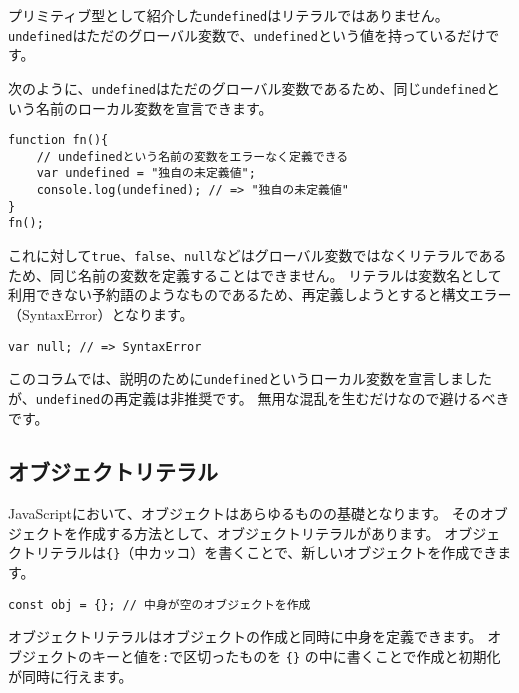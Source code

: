 \begin{tcolorbox}[title=undefinedはリテラルではない]\label{undefined-is-not-literal}

プリミティブ型として紹介した\texttt{undefined}はリテラルではありません。
\texttt{undefined}はただのグローバル変数で、\texttt{undefined}という値を持っているだけです。

次のように、\texttt{undefined}はただのグローバル変数であるため、同じ\texttt{undefined}という名前のローカル変数を宣言できます。

\begin{lstlisting}
function fn(){
    // undefinedという名前の変数をエラーなく定義できる
    var undefined = "独自の未定義値"; 
    console.log(undefined); // => "独自の未定義値"
}
fn();
\end{lstlisting}

これに対して\texttt{true}、\texttt{false}、\texttt{null}などはグローバル変数ではなくリテラルであるため、同じ名前の変数を定義することはできません。
リテラルは変数名として利用できない予約語のようなものであるため、再定義しようとすると構文エラー（SyntaxError）となります。

\begin{lstlisting}
var null; // => SyntaxError
\end{lstlisting}

このコラムでは、説明のために\texttt{undefined}というローカル変数を宣言しましたが、\texttt{undefined}の再定義は非推奨です。
無用な混乱を生むだけなので避けるべきです。
\end{tcolorbox}

\hypertarget{object-literal}{%
\subsection{オブジェクトリテラル}\label{object-literal}}

JavaScriptにおいて、オブジェクトはあらゆるものの基礎となります。
そのオブジェクトを作成する方法として、オブジェクトリテラルがあります。
オブジェクトリテラルは\texttt{\{\}}（中カッコ）を書くことで、新しいオブジェクトを作成できます。

\begin{lstlisting}
const obj = {}; // 中身が空のオブジェクトを作成
\end{lstlisting}

オブジェクトリテラルはオブジェクトの作成と同時に中身を定義できます。
オブジェクトのキーと値を\texttt{:}で区切ったものを
\texttt{\{\}}
の中に書くことで作成と初期化が同時に行えます。

